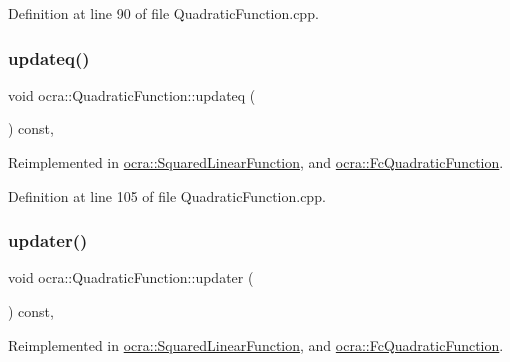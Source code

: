 Definition at line 90 of file Quadratic\+Function.\+cpp.

\hypertarget{classocra_1_1QuadraticFunction_ae68e94211c94e8c32da2220132baf248}{}\label{classocra_1_1QuadraticFunction_ae68e94211c94e8c32da2220132baf248} 
\subsubsection{\texorpdfstring{updateq()}{updateq()}}
{\footnotesize\ttfamily void ocra\+::\+Quadratic\+Function\+::updateq (\begin{DoxyParamCaption}{ }\end{DoxyParamCaption}) const\hspace{0.3cm}{\ttfamily [protected]}, {\ttfamily [virtual]}}



Reimplemented in \hyperlink{classocra_1_1SquaredLinearFunction_a6fec3532febfdea70c28457ea826111e}{ocra\+::\+Squared\+Linear\+Function}, and \hyperlink{classocra_1_1FcQuadraticFunction_ac6bcfaccbe16a821e0f1d7c29744d138}{ocra\+::\+Fc\+Quadratic\+Function}.



Definition at line 105 of file Quadratic\+Function.\+cpp.

\hypertarget{classocra_1_1QuadraticFunction_aeaa560b1771f4024755753236fd69779}{}\label{classocra_1_1QuadraticFunction_aeaa560b1771f4024755753236fd69779} 
\subsubsection{\texorpdfstring{updater()}{updater()}}
{\footnotesize\ttfamily void ocra\+::\+Quadratic\+Function\+::updater (\begin{DoxyParamCaption}{ }\end{DoxyParamCaption}) const\hspace{0.3cm}{\ttfamily [protected]}, {\ttfamily [virtual]}}



Reimplemented in \hyperlink{classocra_1_1SquaredLinearFunction_ab74b479275839850f1c98ac2fa3137bd}{ocra\+::\+Squared\+Linear\+Function}, and \hyperlink{classocra_1_1FcQuadraticFunction_aab41d4b011590ad42766e66df34305da}{ocra\+::\+Fc\+Quadratic\+Function}.



